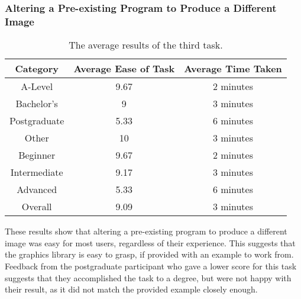 \documentclass[../main.tex]{subfiles}
\begin{document}
            \subsubsection{Altering a Pre-existing Program to Produce a Different Image}
                \begin{table}[H]
                    \centering
                    \begin{tabular}{c|c|c}
                        \textbf{Category} & \textbf{Average Ease of Task} & \textbf{Average Time Taken} \\
                        \hline
                        A-Level           & 9.67                          & 2 minutes                   \\
                        Bachelor's        & 9                             & 3 minutes                   \\
                        Postgraduate      & 5.33                          & 6 minutes                   \\
                        Other             & 10                            & 3 minutes                   \\
                        \hline
                        Beginner          & 9.67                          & 2 minutes                   \\
                        Intermediate      & 9.17                          & 3 minutes                   \\
                        Advanced          & 5.33                          & 6 minutes                   \\
                        \hline
                        Overall           & 9.09                          & 3 minutes                   \\
                    \end{tabular}
                    \caption{The average results of the third task.}
                \end{table}

                These results show that altering a pre-existing program to produce a different
                    image was easy for most users, regardless of their experience.
                This suggests that the graphics library is easy to grasp, if provided with an
                    example to work from.
                Feedback from the postgraduate participant who gave a lower score for this task
                    suggests that they accomplished the task to a degree, but were not happy with
                    their result, as it did not match the provided example closely enough.
\end{document}
